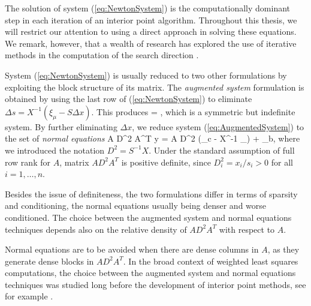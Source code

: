 The solution of system (\ref{eq:NewtonSystem}) is the computationally
dominant step in each iteration of an interior point algorithm.
Throughout this thesis, we will 
restrict our attention to using a direct approach in solving these
equations.
We remark, however, that a wealth of research has explored the use
of iterative methods in the computation of the search direction
\cite{BergamaschiGondzioZilli,OliveiraSorensen05}.

System (\ref{eq:NewtonSystem}) is usually reduced to two other
formulations by exploiting the block structure of its
matrix.
%
The {\em augmented system} formulation is obtained by using 
the last row of (\ref{eq:NewtonSystem}) to eliminate
$\Delta s = X^{-1} (\xi_\mu - S\Delta x)$.
This produces
%
\be \label{eq:AugmentedSystem}
\left[ \begin{array}{cc}
    -X^{-1}S & A^T \\ A & 0
  \end{array} \right]
 =
\left[ \begin{array}{c}
    \xi_c - X^{-1}\xi_\mu \\ \xi_b
   \end{array} \right],
\ee
which is a symmetric but indefinite system.
%
By further eliminating $\Delta x$, we reduce system 
(\ref{eq:AugmentedSystem}) to the set of {\em normal equations}
%
\be \label{eq:NormalEquations}
  A D^2 A^T \Delta y = A D^2 (\xi_c - X^{-1} \xi_\mu) + \xi_b,
\ee
%
where we introduced the notation $D^2 = S^{-1} X$.
Under the standard assumption of full row rank for $A$, matrix 
$A D^2 A^T$ is positive definite, since $D^2_i = x_i/s_i > 0$ for
all $i = 1, \ldots, n$.

Besides the issue of definiteness, the two formulations differ in
terms of sparsity and conditioning, the normal equations usually 
being denser and worse conditioned.
The choice between the augmented system and normal equations
techniques depends also on 
the relative density of $AD^2A^T$ with respect to $A$.

Normal equations are to be avoided when there are dense columns in $A$, 
as they generate dense blocks in $AD^2A^T$.
In the broad context of weighted least squares computations, the choice
between the augmented system and normal equations techniques was studied long
before the development of interior point methods, see for example
\cite{DuffErismanReid86}.

